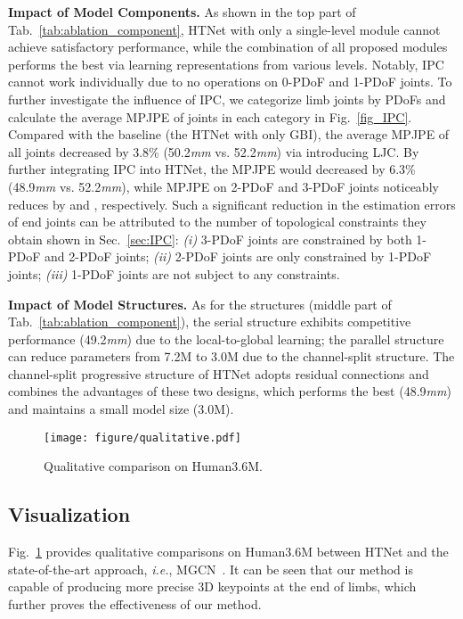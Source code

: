 \documentclass{article}
\def\VspacePc{\vspace{-0.15cm}}
\def\VspacePd{\vspace{-0.10cm}}
\begin{document}
\noindent \textbf{Impact of Model Components.}
As shown in the top part of Tab.~\ref{tab:ablation_component}, HTNet with only a single-level module cannot achieve satisfactory performance, while the combination of all proposed modules performs the best via learning representations from various levels. 
Notably, IPC cannot work individually due to no operations on 0-PDoF and 1-PDoF joints. To further investigate the influence of IPC, we categorize limb joints by PDoFs and calculate the average MPJPE of joints in each category in Fig.~\ref{fig_IPC}.
Compared with the baseline (the HTNet with only GBI), the average MPJPE of all joints decreased by 3.8\% (50.2\textit{mm} vs. 52.2\textit{mm}) via introducing LJC. By further integrating IPC into HTNet, the MPJPE would decreased by 6.3\% (48.9\textit{mm} vs. 52.2\textit{mm}), while MPJPE on 2-PDoF and 3-PDoF joints noticeably reduces by  and , respectively.
Such a significant reduction in the estimation errors of end joints can be attributed to the number of topological constraints they obtain shown in Sec.~\ref{sec:IPC}: \textit{(i)} 3-PDoF joints are constrained by both 1-PDoF and 2-PDoF joints; \textit{(ii)} 2-PDoF joints are only constrained by 1-PDoF joints; \textit{(iii)} 1-PDoF joints are not subject to any constraints. 
\vspace{0.05cm}


\noindent \textbf{Impact of Model Structures.}
As for the structures (middle part of Tab.~\ref{tab:ablation_component}), the serial structure exhibits competitive performance (49.2\textit{mm}) due to the local-to-global learning; the parallel structure can reduce parameters from 7.2M to 3.0M due to the channel-split structure. The channel-split progressive structure of HTNet adopts residual connections and combines the advantages of these two designs, which performs the best (48.9\textit{mm}) and maintains a small model size (3.0M).

\begin{figure}[t]
    \centering
    \texttt{[image: figure/qualitative.pdf]}
\caption
    {
        Qualitative comparison on Human3.6M.
    }
    \label{fig_qua}
    \vspace{-0.1cm}
\end{figure}

\VspacePc
\subsection{Visualization}
\VspacePd
Fig.~\ref{fig_qua} provides qualitative comparisons on Human3.6M between HTNet and the state-of-the-art approach, \textit{i.e.}, MGCN~\cite{mgcn}.
It can be seen that our method is capable of producing more precise 3D keypoints at the end of limbs, which further proves the effectiveness of our method.
\end{document}
